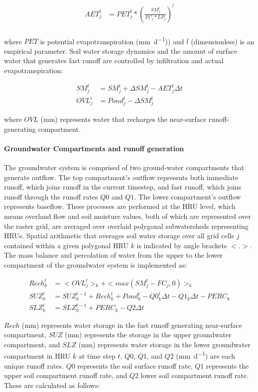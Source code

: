 \begin{align}
AET_j^t &= PET_j^t * \left(\frac{SM_j^t}{FC_j * LP_j} \right)^l  \\
\end{align}

\noindent where $PET$ is potential evapotranspiration (\si{\milli\metre\per\day})) and $l$ (dimensionless) is an empirical  parameter. Soil water storage dynamics and the amount of surface water that generates fast runoff are controlled by infiltration and actual evapotranspiration:

\begin{align}
SM_j^t &= SM_j^{t} + \Delta SM_j^t - AET_j^t \Delta t\\
OVL_j^t &= Pond_j^t - \Delta SM_j^t
\end{align}

\noindent where $OVL$ (\si{\milli\metre}) represents water that recharges the near-surface runoff-generating compartment.

\paragraph{Groundwater Compartments and runoff generation}
The groundwater system is comprised of two ground-water compartments that generate outflow. The top compartment's outflow represents both immediate runoff, which joins runoff in the current timestep, and fast runoff, which joins runoff through the runoff rates $Q0$ and $Q1$. The lower compartment's outflow represents baseflow. These processes are performed at the HRU level, which means overland flow and soil moisture values, both of which are represented over the raster grid, are averaged over overlaid polygonal subwatersheds representing HRUs. Spatial arithmetic that averages soil water storage over all grid cells $j$ contained within a given polygonal HRU $k$ is indicated by angle brackets $<.>$. The mass balance and percolation of water from the upper to the lower compartment of the groundwater system is implemented as:

\begin{align}
Rech_k^t &= <OVL_j^t>_k + <max(SM_j^t - FC_j, 0)>_k\\
SUZ_k^t &= SUZ_k^{t-1} + Rech_k^t + Pond_k^t - Q0_k^t\Delta t - Q1_k\Delta t - PERC_k\\
SLZ_k^t &= SLZ_k^{t-1} + PERC_k - Q2 \Delta t
\end{align}

\noindent $Rech$ (\si{\milli\meter}) represents water storage in the fast runoff generating near-surface compartment, $SUZ$ (\si{\milli\meter}) represents the storage in the upper groundwater compartment, and $SLZ$ (\si{\milli\meter}) represents water storage in the lower groundwater compartment in HRU $k$ at time step $t$. $Q0$, $Q1$, and $Q2$ (\si{\milli\meter\per\day}) are each unique runoff rates. $Q0$ represents the soil surface runoff rate, $Q1$ represents the upper soil compartment runoff rate, and $Q2$ lower soil compartment runoff rate. These are calculated as follows:

